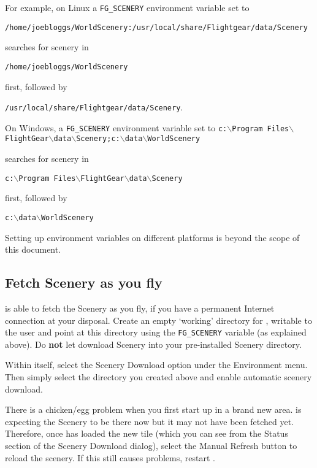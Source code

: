 For example, on Linux a \texttt{FG\_SCENERY} environment variable set to

\noindent
\texttt{/home/joebloggs/WorldScenery:/usr/local/share/Flightgear/data/Scenery}

\noindent
searches for scenery in

\noindent
\texttt{/home/joebloggs/WorldScenery}

\noindent
first, followed by

\noindent
\texttt{/usr/local/share/Flightgear/data/Scenery}.

\medskip
On Windows, a \texttt{FG\_SCENERY} environment variable set to
\texttt{c:$\backslash$Program Files$\backslash$FlightGear$\backslash$data$\backslash$Scenery;c:$\backslash$data$\backslash$WorldScenery}

\noindent
searches for scenery in

\noindent
\texttt{c:$\backslash$Program Files$\backslash$FlightGear$\backslash$data$\backslash$Scenery}


\noindent
first, followed by

\noindent
\texttt{c:$\backslash$data$\backslash$WorldScenery}

\medskip
Setting up environment variables on different platforms is beyond the scope of this document.

\subsection{Fetch Scenery as you fly}

\FlightGear{} is able to fetch the Scenery as you fly, if you have a permanent
Internet connection at your disposal. Create an empty `working'
directory for \TerraSync{}, writable to the user and point
\FlightGear{} at this directory using the \texttt{FG\_SCENERY} variable
(as explained above). Do \textbf{not} let \TerraSync{} download Scenery
into your pre-installed Scenery directory.

Within \FlightGear{} itself, select the Scenery Download option under the 
Environment menu. Then simply select the directory you created above and enable automatic scenery download.

There is a chicken/egg problem when you first start up in a brand new
area.  \FlightGear{} is expecting the Scenery to be there now but it may
not have been fetched yet. Therefore, once \TerraSync{} has loaded the new
tile (which you can see from the Status section of the Scenery Download
dialog), select the Manual Refresh button to reload the scenery. If this
still causes problems, restart \FlightGear{}.

